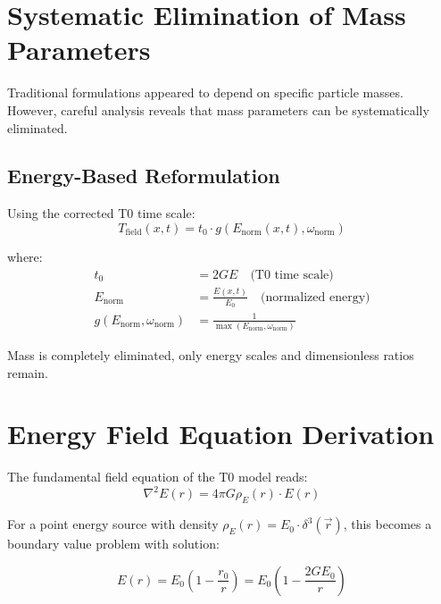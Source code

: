 \documentclass[12pt,a4paper]{report}
\newcommand{\rzero}{r_0}                  %
\newcommand{\tzero}{t_0}                  %
\begin{document}
	\section{Systematic Elimination of Mass Parameters}
	\label{sec:mass_elimination}
	
	Traditional formulations appeared to depend on specific particle masses. However, careful analysis reveals that mass parameters can be systematically eliminated.
	
	\subsection{Energy-Based Reformulation}
	\label{subsec:energy_based_reformulation}
	
	Using the corrected T0 time scale:
	\begin{equation}
		\boxed{T_{\text{field}}(x,t) = \tzero \cdot g(E_{\text{norm}}(x,t), \omega_{\text{norm}})}
		\label{eq:time_field_energy_based}
	\end{equation}
	
	where:
	\begin{align}
		\tzero &= 2GE \quad \text{(T0 time scale)} \\
		E_{\text{norm}} &= \frac{E(x,t)}{E_0} \quad \text{(normalized energy)} \\
		g(E_{\text{norm}}, \omega_{\text{norm}}) &= \frac{1}{\max(E_{\text{norm}}, \omega_{\text{norm}})}
	\end{align}
	
	Mass is completely eliminated, only energy scales and dimensionless ratios remain.
	
	\section{Energy Field Equation Derivation}
	\label{sec:energy_field_equation}
	
	The fundamental field equation of the T0 model reads:
	\begin{equation}
		\nabla^2 E(r) = 4\pi G \rho_E(r) \cdot E(r)
		\label{eq:t0_field_equation_energy}
	\end{equation}
	
	For a point energy source with density $\rho_E(r) = E_0 \cdot \delta^3(\vec{r})$, this becomes a boundary value problem with solution:
	
	\begin{equation}
		\boxed{E(r) = E_0\left(1 - \frac{\rzero}{r}\right) = E_0\left(1 - \frac{2GE_0}{r}\right)}
		\label{eq:complete_energy_solution}
	\end{equation}
	
\end{document}

